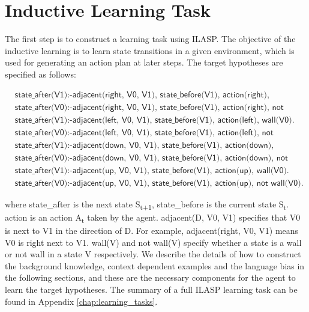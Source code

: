 \section{Inductive Learning Task}
\label{sec:inductive_learning_task}
The first step is to construct a learning task using ILASP. The objective of the inductive learning is to learn state transitions in a given environment, which is used for generating an action plan at later steps.
The target hypotheses are specified as follows:

\begin{equation}
\begin{split}
&\textsf{state\_after(V1):-adjacent(right, V0, V1), state\_before(V1), action(right), wall(V0).}\\
&\textsf{state\_after(V0):-adjacent(right, V0, V1), state\_before(V1), action(right), not wall(V0).}\\
&\textsf{state\_after(V1):-adjacent(left, V0, V1), state\_before(V1), action(left), wall(V0).}\\
&\textsf{state\_after(V0):-adjacent(left, V0, V1), state\_before(V1), action(left), not wall(V0).}\\
&\textsf{state\_after(V1):-adjacent(down, V0, V1), state\_before(V1), action(down), wall(V0).}\\
&\textsf{state\_after(V0):-adjacent(down, V0, V1), state\_before(V1), action(down), not wall(V0).}\\
&\textsf{state\_after(V1):-adjacent(up, V0, V1), state\_before(V1),  action(up), wall(V0).}\\
&\textsf{state\_after(V0):-adjacent(up, V0, V1), state\_before(V1), action(up), not wall(V0).}
\end{split}
\label{target_hypothesis}
\end{equation}

where \textsf{state\_after} is the next state S\textsubscript{t+1}, \textsf{state\_before} is the current state S\textsubscript{t}. \textsf{action} is an action A\textsubscript{t} taken by the agent.
\textsf{adjacent(D, V0, V1)} specifies that V0 is next to V1 in the direction of D. For example, \textsf{adjacent(right, V0, V1)} means V0 is right next to V1. 
\textsf{wall(V)} and \textsf{not wall(V)} specify whether a state is a wall or not wall in a state V respectively.
We describe the details of how to construct the background knowledge, context dependent examples and the language bias in the following sections, and these are the necessary components for the agent to learn the target hypotheses.
The summary of a full ILASP learning task can be found in Appendix \ref{chap:learning_tasks}.

